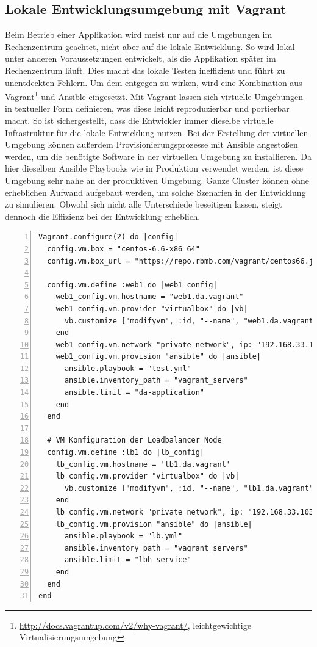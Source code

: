 \subsection{Lokale Entwicklungsumgebung mit Vagrant}
Beim Betrieb einer Applikation wird meist nur auf die Umgebungen im Rechenzentrum geachtet, nicht aber auf die lokale Entwicklung. So wird lokal unter anderen Voraussetzungen entwickelt, als die Applikation später im Rechenzentrum läuft. Dies macht das lokale Testen ineffizient und führt zu unentdeckten Fehlern. Um dem entgegen zu wirken, wird eine Kombination aus Vagrant\footnote{\url{http://docs.vagrantup.com/v2/why-vagrant/}, leichtgewichtige Virtualisierungsumgebung} und Ansible eingesetzt. Mit Vagrant lassen sich virtuelle Umgebungen in textueller Form definieren, was diese leicht reproduzierbar und portierbar macht. So ist sichergestellt, dass die Entwickler immer dieselbe virtuelle Infrastruktur für die lokale Entwicklung nutzen. Bei der Erstellung der virtuellen Umgebung können außerdem Provisionierungsprozesse mit Ansible angestoßen werden, um die benötigte Software in der virtuellen Umgebung zu installieren. Da hier dieselben Ansible Playbooks wie in Produktion verwendet werden, ist diese Umgebung sehr nahe an der produktiven Umgebung. Ganze Cluster können ohne erheblichen Aufwand aufgebaut werden, um solche Szenarien in der Entwicklung zu simulieren. Obwohl sich nicht alle Unterschiede beseitigen lassen, steigt dennoch die Effizienz bei der Entwicklung erheblich.
 
\begin{lstlisting}[style=code,numbers=left,caption={Beispielhaftes Vagrantfile des Delivery Agent},label={lst:vagrantfile}]
Vagrant.configure(2) do |config|
  config.vm.box = "centos-6.6-x86_64"
  config.vm.box_url = "https://repo.rbmb.com/vagrant/centos66.json"
  
  config.vm.define :web1 do |web1_config|
    web1_config.vm.hostname = "web1.da.vagrant"
    web1_config.vm.provider "virtualbox" do |vb|
      vb.customize ["modifyvm", :id, "--name", "web1.da.vagrant", "--memory", "512", "--cpus", "1", "--ioapic", "on"]
    end
    web1_config.vm.network "private_network", ip: "192.168.33.101"
    web1_config.vm.provision "ansible" do |ansible|
      ansible.playbook = "test.yml"
      ansible.inventory_path = "vagrant_servers"
      ansible.limit = "da-application"
    end
  end

  # VM Konfiguration der Loadbalancer Node
  config.vm.define :lb1 do |lb_config|
    lb_config.vm.hostname = 'lb1.da.vagrant'
    lb_config.vm.provider "virtualbox" do |vb|
      vb.customize ["modifyvm", :id, "--name", "lb1.da.vagrant", "--memory", "256", "--cpus", "1", "--ioapic", "on"]
    end
    lb_config.vm.network "private_network", ip: "192.168.33.103"
    lb_config.vm.provision "ansible" do |ansible|
      ansible.playbook = "lb.yml"
      ansible.inventory_path = "vagrant_servers"
      ansible.limit = "lbh-service"
    end
  end
end
\end{lstlisting}

